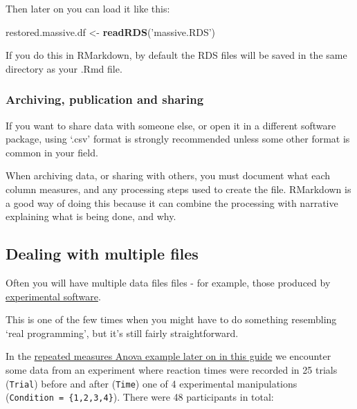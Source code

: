 \documentclass[]{article}
\newenvironment{Shaded}{\begin{snugshade}}{\end{snugshade}}
\newcommand{\KeywordTok}[1]{\textcolor[rgb]{0.13,0.29,0.53}{\textbf{#1}}}
\newcommand{\StringTok}[1]{\textcolor[rgb]{0.31,0.60,0.02}{#1}}
\newcommand{\NormalTok}[1]{#1}
\theoremstyle{definition}
\theoremstyle{definition}
\theoremstyle{definition}
\theoremstyle{remark}
\begin{document}
Then later on you can load it like this:

\begin{Shaded}
\begin{Highlighting}[]
\NormalTok{restored.massive.df <-}\StringTok{  }\KeywordTok{readRDS}\NormalTok{(}\StringTok{'massive.RDS'}\NormalTok{)}
\end{Highlighting}
\end{Shaded}

{If you do this in RMarkdown, by default the RDS files will be saved in
the same directory as your .Rmd file.}

\subsubsection*{Archiving, publication and
sharing}\label{archiving-publication-and-sharing}

If you want to share data with someone else, or open it in a different
software package, using `.csv' format is strongly recommended unless
some other format is common in your field.

When archiving data, or sharing with others, you must document what each
column measures, and any processing steps used to create the file.
RMarkdown is a good way of doing this because it can combine the
processing with narrative explaining what is being done, and why.

\hypertarget{multiple-raw-data-files}{\subsection*{Dealing with multiple
files}\label{multiple-raw-data-files}}

Often you will have multiple data files files - for example, those
produced by \href{http://www.psychopy.org}{experimental software}.

This is one of the few times when you might have to do something
resembling `real programming', but it's still fairly straightforward.

In the \protect\hyperlink{trad-rm-anova}{repeated measures Anova example
later on in this guide} we encounter some data from an experiment where
reaction times were recorded in 25 trials (\texttt{Trial}) before and
after (\texttt{Time}) one of 4 experimental manipulations
(\texttt{Condition\ =\ \{1,2,3,4\}}). There were 48 participants in
total:
\end{document}
